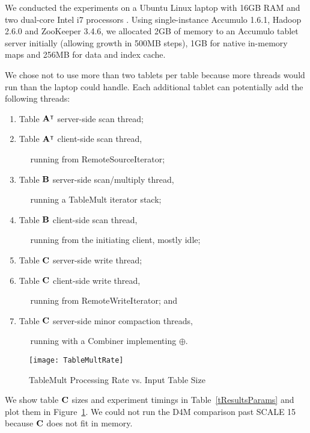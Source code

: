 We conducted the experiments on a Ubuntu Linux laptop with 16GB RAM and two dual-core Intel i7 processors%
. Using single-instance Accumulo 1.6.1, Hadoop 2.6.0 and ZooKeeper 3.4.6,
we allocated 2GB of memory to an Accumulo tablet server initially
(allowing growth in 500MB steps),
1GB for native in-memory maps and 256MB for data and index cache.


We chose not to use more than two tablets per table because more threads would run
than the laptop could handle.  Each additional tablet can potentially add the following threads:
\begin{enumerate}
\item Table $\mathbf{A}^{\intercal}$ server-side scan thread;
\item Table $\mathbf{A}^{\intercal}$ client-side scan thread,

$\quad$ running from RemoteSourceIterator;
\item Table $\mathbf{B}$ server-side scan/multiply thread,

$\quad$ running a TableMult iterator stack;
\item Table $\mathbf{B}$ client-side scan thread, 

$\quad$ running from the initiating client, mostly idle;
\item Table $\mathbf{C}$ server-side write thread;
\item Table $\mathbf{C}$ client-side write thread,

$\quad$ running from RemoteWriteIterator; and
\item Table $\mathbf{C}$ server-side minor compaction threads,

$\quad$ running with a Combiner implementing $\oplus$.
\end{enumerate}

\begin{figure}[t]
\centering
\texttt{[image: TableMultRate]}
\caption{TableMult Processing Rate vs. Input Table Size}
\label{fTableMultPerf}
\end{figure}

We show table $\mathbf{C}$ sizes and experiment timings in Table~\ref{tResultsParams}
and plot them in Figure~\ref{fTableMultPerf}.
We could not run the D4M comparison past SCALE 15 because $\mathbf{C}$ does not fit in memory.

